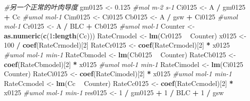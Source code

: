 \documentclass[
]{krantz}
\makeatletter
\newenvironment{Shaded}{\begin{snugshade}}{\end{snugshade}}
\newcommand{\CommentTok}[1]{\textcolor[rgb]{0.56,0.35,0.01}{\textit{#1}}}
\newcommand{\DecValTok}[1]{\textcolor[rgb]{0.00,0.00,0.81}{#1}}
\newcommand{\FloatTok}[1]{\textcolor[rgb]{0.00,0.00,0.81}{#1}}
\newcommand{\KeywordTok}[1]{\textcolor[rgb]{0.13,0.29,0.53}{\textbf{#1}}}
\newcommand{\NormalTok}[1]{#1}
\newcommand{\OperatorTok}[1]{\textcolor[rgb]{0.81,0.36,0.00}{\textbf{#1}}}
\newcommand{\StringTok}[1]{\textcolor[rgb]{0.31,0.60,0.02}{#1}}
\newenvironment{kframe}{%
\medskip{}
\setlength{\fboxsep}{.8em}
 \def\at@end@of@kframe{}%
 \ifinner\ifhmode%
  \def\at@end@of@kframe{\end{minipage}}%
  \begin{minipage}{\columnwidth}%
 \fi\fi%
 \def\FrameCommand##1{\hskip\@totalleftmargin \hskip-\fboxsep
 \colorbox{shadecolor}{##1}\hskip-\fboxsep
     \hskip-\linewidth \hskip-\@totalleftmargin \hskip\columnwidth}%
 \MakeFramed {\advance\hsize-\width
   \@totalleftmargin\z@ \linewidth\hsize
   \@setminipage}}%
 {\par\unskip\endMakeFramed%
 \at@end@of@kframe}
\renewenvironment{Shaded}{\begin{kframe}}{\end{kframe}}
\makeatother
\begin{document}
\begin{Shaded}
\begin{Highlighting}[]
\CommentTok{#另一个正常的叶肉导度}
\NormalTok{gm0125 <-}\StringTok{ }\FloatTok{0.125} \CommentTok{#mol m-2 s-1}
\NormalTok{Ci0125 <-}\StringTok{ }\NormalTok{A }\OperatorTok{/}\StringTok{ }\NormalTok{gm0125 }\OperatorTok{+}\StringTok{ }\NormalTok{Cc }\CommentTok{#umol mol-1}
\NormalTok{Cim0125 <-}\StringTok{ }\NormalTok{Ci0125}
\NormalTok{Cb0125 <-}\StringTok{ }\NormalTok{A }\OperatorTok{/}\StringTok{ }\NormalTok{gsw }\OperatorTok{+}\StringTok{ }\NormalTok{Ci0125 }\CommentTok{#umol mol-1}
\NormalTok{Cr0125 <-}\StringTok{ }\NormalTok{A }\OperatorTok{/}\StringTok{ }\NormalTok{BLC }\OperatorTok{+}\StringTok{ }\NormalTok{Cb0125 }\CommentTok{#umol mol-1}
\NormalTok{Counter <-}\StringTok{ }\KeywordTok{as.numeric}\NormalTok{(}\KeywordTok{c}\NormalTok{(}\DecValTok{1}\OperatorTok{:}\KeywordTok{length}\NormalTok{(Cc)))}
\NormalTok{RateCrmodel <-}\StringTok{ }\KeywordTok{lm}\NormalTok{(Cr0125 }\OperatorTok{~}\StringTok{ }\NormalTok{Counter)}
\NormalTok{x0125 <-}\StringTok{ }\DecValTok{100} \OperatorTok{/}\StringTok{ }\KeywordTok{coef}\NormalTok{(RateCrmodel)[}\DecValTok{2}\NormalTok{]}
\NormalTok{RateCr0125 <-}\StringTok{ }\KeywordTok{coef}\NormalTok{(RateCrmodel)[}\DecValTok{2}\NormalTok{] }\OperatorTok{*}\StringTok{ }\NormalTok{x0125 }\CommentTok{#umol mol-1 min-1}
\NormalTok{RateCbmodel <-}\StringTok{ }\KeywordTok{lm}\NormalTok{(Cb0125 }\OperatorTok{~}\StringTok{ }\NormalTok{Counter)}
\NormalTok{RateCb0125 <-}\StringTok{ }\KeywordTok{coef}\NormalTok{(RateCbmodel)[}\DecValTok{2}\NormalTok{] }\OperatorTok{*}\StringTok{ }\NormalTok{x0125 }\CommentTok{#umol mol-1 min-1}
\NormalTok{RateCimodel <-}\StringTok{ }\KeywordTok{lm}\NormalTok{(Ci0125 }\OperatorTok{~}\StringTok{ }\NormalTok{Counter)}
\NormalTok{RateCi0125 <-}\StringTok{ }\KeywordTok{coef}\NormalTok{(RateCimodel)[}\DecValTok{2}\NormalTok{] }\OperatorTok{*}\StringTok{ }\NormalTok{x0125 }\CommentTok{#umol mol-1 min-1}
\NormalTok{RateCcmodel <-}\StringTok{ }\KeywordTok{lm}\NormalTok{(Cc }\OperatorTok{~}\StringTok{ }\NormalTok{Counter)}
\NormalTok{RateCc0125 <-}\StringTok{ }\KeywordTok{coef}\NormalTok{(RateCcmodel)[}\DecValTok{2}\NormalTok{] }\OperatorTok{*}\StringTok{ }\NormalTok{x0125 }\CommentTok{#umol mol-1 min-1}
\NormalTok{res0125 <-}\StringTok{ }\DecValTok{1} \OperatorTok{/}\StringTok{ }\NormalTok{gm0125 }\OperatorTok{+}\StringTok{ }\DecValTok{1} \OperatorTok{/}\StringTok{ }\NormalTok{BLC }\OperatorTok{+}\StringTok{ }\DecValTok{1} \OperatorTok{/}\StringTok{ }\NormalTok{gsw}


\end{Highlighting}
\end{Shaded}
\end{document}
